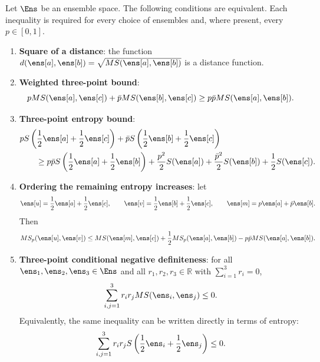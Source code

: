 \begin{prop}\label{pm-es-mixingEntropyDistanceEquivalences}
	Let $\Ens$ be an ensemble space. The following conditions are equivalent. Each inequality is required for every choice of ensembles and, where present, every $p\in[0,1]$.
	\begin{enumerate}
		\item \textbf{Square of a distance}: the function $d(\ens[a],\ens[b])=\sqrt{MS(\ens[a],\ens[b])}$ is a distance function.
		
		\item \textbf{Weighted three-point bound}:
		\begin{equation}
			pMS(\ens[a],\ens[c])+\bar{p}MS(\ens[b],\ens[c]) \geq p\bar{p}MS(\ens[a],\ens[b]).
		\end{equation}
		
		\item \textbf{Three-point entropy bound}:
		\begin{equation}
			\begin{aligned}
				&pS\left(\frac{1}{2}\ens[a]+\frac{1}{2}\ens[c]\right)
				+\bar{p}S\left(\frac{1}{2}\ens[b]+\frac{1}{2}\ens[c]\right)\\
				&\qquad\geq p\bar{p}S\left(\frac{1}{2}\ens[a]+\frac{1}{2}\ens[b]\right)
				+\frac{p^2}{2}S(\ens[a])+\frac{\bar{p}^2}{2}S(\ens[b])+\frac{1}{2}S(\ens[c]).
			\end{aligned}
		\end{equation}
		
		\item \textbf{Ordering the remaining entropy increases}: let
		\begin{equation}
			\ens[u]=\frac{1}{2}\ens[a]+\frac{1}{2}\ens[c],\qquad
			\ens[v]=\frac{1}{2}\ens[b]+\frac{1}{2}\ens[c],\qquad
			\ens[m]=p\ens[a]+\bar{p}\ens[b].
		\end{equation}
		Then
		\begin{equation}
			MS_p(\ens[u],\ens[v])
			\leq MS(\ens[m],\ens[c])+\frac{1}{2}MS_p(\ens[a],\ens[b])-p\bar{p}MS(\ens[a],\ens[b]).
		\end{equation}
		
		\item \textbf{Three-point conditional negative definiteness}: for all $\ens_1,\ens_2,\ens_3\in\Ens$ and all $r_1,r_2,r_3\in\mathbb{R}$ with $\sum_{i=1}^3 r_i=0$,
		\begin{equation}
			\sum_{i,j=1}^3 r_i r_j MS(\ens_i,\ens_j) \leq 0.
		\end{equation}
		Equivalently, the same inequality can be written directly in terms of entropy:
		\begin{equation}
			\sum_{i,j=1}^3 r_i r_j S\left(\frac{1}{2}\ens_i+\frac{1}{2}\ens_j\right) \leq 0.
		\end{equation}
		

\end{enumerate}
\end{prop}
